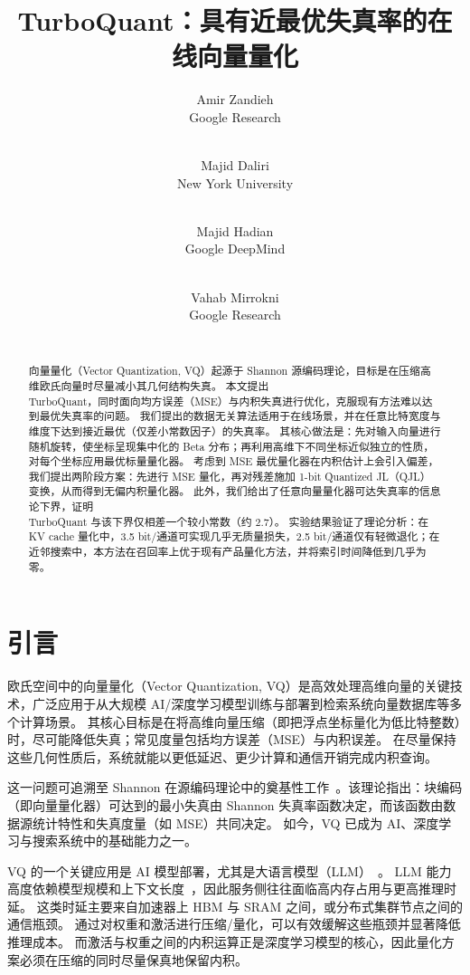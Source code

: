 \documentclass[11pt]{ctexart}
\title{TurboQuant：具有近最优失真率的在线向量量化}
\author{
  Amir Zandieh\\
  Google Research\\
  \email{zandieh@google.com} \\
  \and
  Majid Daliri\\
  New York University\\
  \email{daliri.majid@nyu.edu} \\
  \and 
  Majid Hadian\\
  Google DeepMind\\
  \email{majidh@google.com} \\
  \and 
  Vahab Mirrokni \\
  Google Research\\
  \email{mirrokni@google.com} \\
}
\date{}
\newcommand{\TurboQuant}{\textsc{TurboQuant}\xspace}
\begin{document}
\maketitle

\begin{abstract}
向量量化（Vector Quantization, VQ）起源于 Shannon 源编码理论，目标是在压缩高维欧氏向量时尽量减小其几何结构失真。
本文提出 \\TurboQuant，同时面向均方误差（MSE）与内积失真进行优化，克服现有方法难以达到最优失真率的问题。
我们提出的数据无关算法适用于在线场景，并在任意比特宽度与维度下达到接近最优（仅差小常数因子）的失真率。
其核心做法是：先对输入向量进行随机旋转，使坐标呈现集中化的 Beta 分布；再利用高维下不同坐标近似独立的性质，对每个坐标应用最优标量量化器。
考虑到 MSE 最优量化器在内积估计上会引入偏差，我们提出两阶段方案：先进行 MSE 量化，再对残差施加 1-bit Quantized JL（QJL）变换，从而得到无偏内积量化器。
此外，我们给出了任意向量量化器可达失真率的信息论下界，证明 \\TurboQuant 与该下界仅相差一个较小常数（约 $2.7$）。
实验结果验证了理论分析：在 KV cache 量化中，3.5 bit/通道可实现几乎无质量损失，2.5 bit/通道仅有轻微退化；在近邻搜索中，本方法在召回率上优于现有产品量化方法，并将索引时间降低到几乎为零。
\end{abstract}


\section{引言}
\label{intro}

欧氏空间中的向量量化（Vector Quantization, VQ）是高效处理高维向量的关键技术，广泛应用于从大规模 AI/深度学习模型训练与部署到检索系统向量数据库等多个计算场景。 
其核心目标是在将高维向量压缩（即把浮点坐标量化为低比特整数）时，尽可能降低失真；常见度量包括均方误差（MSE）与内积误差。
在尽量保持这些几何性质后，系统就能以更低延迟、更少计算和通信开销完成内积查询。

这一问题可追溯至 Shannon 在源编码理论中的奠基性工作~\cite{shannon1948mathematical, shannon1959coding}。该理论指出：块编码（即向量量化器）可达到的最小失真由 Shannon 失真率函数决定，而该函数由数据源统计特性和失真度量（如 MSE）共同决定。 
如今，VQ 已成为 AI、深度学习与搜索系统中的基础能力之一。


VQ 的一个关键应用是 AI 模型部署，尤其是大语言模型（LLM）~\cite{achiam2023gpt, dubey2024llama, claude, team2024gemini}。 
LLM 能力高度依赖模型规模和上下文长度~\cite{kaplan2020scaling}，因此服务侧往往面临高内存占用与更高推理时延。 
这类时延主要来自加速器上 HBM 与 SRAM 之间，或分布式集群节点之间的通信瓶颈。 
通过对权重和激活进行压缩/量化，可以有效缓解这些瓶颈并显著降低推理成本。 
而激活与权重之间的内积运算正是深度学习模型的核心，因此量化方案必须在压缩的同时尽量保真地保留内积。 
\end{document}
